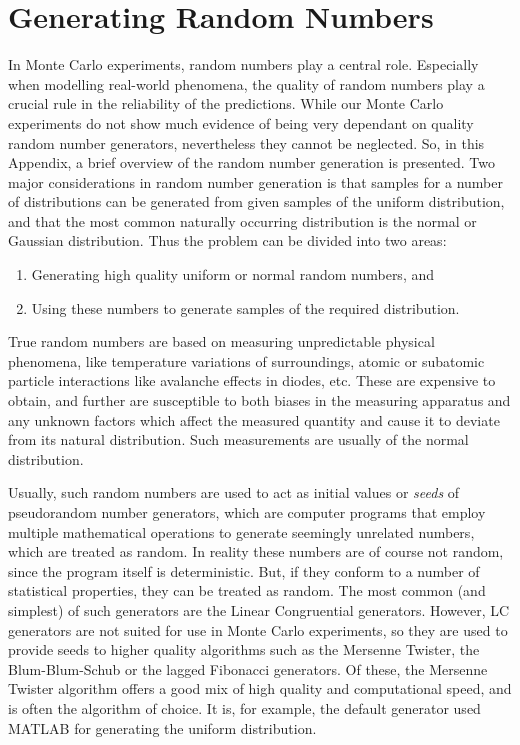 \chapter{Generating Random Numbers}
\label{app:C}
In Monte Carlo experiments, random numbers play a central role. Especially 
when modelling real-world phenomena, the quality of random numbers play a 
crucial rule in the reliability of the predictions. While our Monte Carlo 
experiments do not show much evidence of being very dependant on quality 
random number generators, nevertheless they cannot be neglected. So, in 
this Appendix, a brief overview of the random number generation is 
presented. Two major considerations in  random number generation is that 
samples for a  number of distributions can be generated from given samples 
of the uniform distribution, and that the most common naturally occurring 
distribution is the normal or Gaussian distribution. Thus the problem can 
be divided into two areas: 
\begin{enumerate}
\item Generating high quality uniform or normal random numbers, and
\item Using these numbers to generate samples of the required distribution.
\end{enumerate}
True random numbers are based on measuring unpredictable physical 
phenomena, like temperature variations of surroundings, atomic or 
subatomic particle interactions like avalanche effects in diodes, etc. 
These are expensive to obtain, and further are susceptible to both biases 
in the measuring apparatus and any unknown factors which affect the 
measured quantity and cause it to deviate from its natural distribution. 
Such measurements are usually of the normal distribution.

Usually, such random numbers are used to act as initial values or 
\emph{seeds} of pseudorandom number generators, which are computer 
programs that employ multiple mathematical operations to generate 
seemingly unrelated numbers, which are treated as random. In reality these 
numbers are of course not random, since the program itself is 
deterministic. But, if they conform to a number of statistical properties, 
they can be treated as random. The most common (and simplest) of such 
generators are the Linear Congruential generators. However, LC generators 
are not suited for use in Monte Carlo experiments, so they are used to 
provide seeds to higher quality algorithms such as the Mersenne Twister, 
the Blum-Blum-Schub or the lagged Fibonacci generators. Of these, the 
Mersenne Twister algorithm offers a good mix of high quality and 
computational speed, and is often the algorithm of choice. It is, for 
example, the default generator used 
\textsc{MATLAB} \textsuperscript{\textregistered} for generating the 
uniform distribution.

